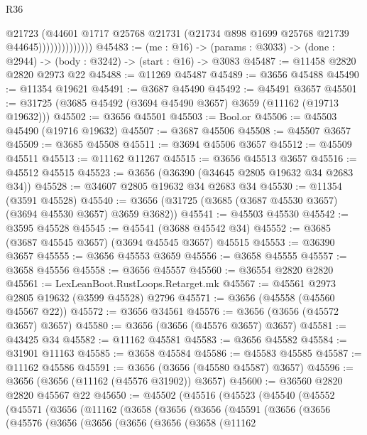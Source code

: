 \begin{lexlean}{R36}
\begin{coremodule}
                            @21723
                            (@44601
                              @1717
                              @25768
                              @21731
                              (@21734 @898 @1699 @25768 @21739 @44645))))))))))))))
@45483 := (me : @16) ->
  (params : @3033) -> (done : @2944) -> (body : @3242) -> (start : @16) -> @3083
@45487 := @11458 @2820 @2820 @2973 @22
@45488 := @11269 @45487
@45489 := @3656 @45488
@45490 := @11354 @19621
@45491 := @3687 @45490
@45492 := @45491 @3657
@45501 := @31725 (@3685 @45492 (@3694 @45490 @3657) @3659 (@11162 (@19713 @19632)))
@45502 := @3656 @45501
@45503 := Bool.or
@45506 := @45503 @45490 (@19716 @19632)
@45507 := @3687 @45506
@45508 := @45507 @3657
@45509 := @3685 @45508
@45511 := @3694 @45506 @3657
@45512 := @45509 @45511
@45513 := @11162 @11267
@45515 := @3656 @45513 @3657
@45516 := @45512 @45515
@45523 := @3656 (@36390 (@34645 @2805 @19632 @34 @2683 @34))
@45528 := @34607 @2805 @19632 @34 @2683 @34
@45530 := @11354 (@3591 @45528)
@45540 := @3656 (@31725 (@3685 (@3687 @45530 @3657) (@3694 @45530 @3657) @3659 @3682))
@45541 := @45503 @45530
@45542 := @3595 @45528
@45545 := @45541 (@3688 @45542 @34)
@45552 := @3685 (@3687 @45545 @3657) (@3694 @45545 @3657) @45515
@45553 := @36390 @3657
@45555 := @3656 @45553 @3659
@45556 := @3658 @45555
@45557 := @3658 @45556
@45558 := @3656 @45557
@45560 := @36554 @2820 @2820
@45561 := LexLeanBoot.RustLoops.Retarget.mk
@45567 := @45561 @2973 @2805 @19632 (@3599 @45528) @2796
@45571 := @3656 (@45558 (@45560 @45567 @22))
@45572 := @3656 @34561
@45576 := @3656 (@3656 (@45572 @3657) @3657)
@45580 := @3656 (@3656 (@45576 @3657) @3657)
@45581 := @43425 @34
@45582 := @11162 @45581
@45583 := @3656 @45582
@45584 := @31901 @11163
@45585 := @3658 @45584
@45586 := @45583 @45585
@45587 := @11162 @45586
@45591 := @3656 (@3656 (@45580 @45587) @3657)
@45596 := @3656 (@3656 (@11162 (@45576 @31902)) @3657)
@45600 := @36560 @2820 @2820 @45567 @22
@45650 := @45502
    (@45516
      (@45523
        (@45540
          (@45552
            (@45571
              (@3656
                (@11162
                  (@3658
                    (@3656
                      (@3656
                        (@45591
                          (@3656
                            (@3656
                              (@45576
                                (@3656
                                  (@3656
                                    (@3656
                                      (@3656
                                        (@3658
                                          (@11162

\end{coremodule}
\end{lexlean}
